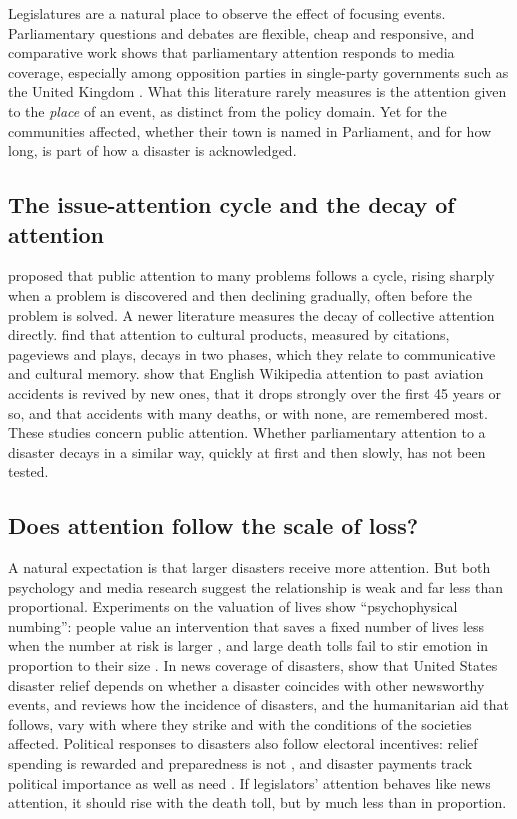 \documentclass[11pt,a4paper]{article}
\begin{document}
Legislatures are a natural place to observe the effect of focusing events. Parliamentary questions and debates are flexible, cheap and responsive, and comparative work shows that parliamentary attention responds to media coverage, especially among opposition parties in single-party governments such as the United Kingdom \citep{WalgraveVanAelst2006,Vliegenthart2016}. What this literature rarely measures is the attention given to the \emph{place} of an event, as distinct from the policy domain. Yet for the communities affected, whether their town is named in Parliament, and for how long, is part of how a disaster is acknowledged.

\subsection{The issue-attention cycle and the decay of attention}
\citet{Downs1972} proposed that public attention to many problems follows a cycle, rising sharply when a problem is discovered and then declining gradually, often before the problem is solved. A newer literature measures the decay of collective attention directly. \citet{Candia2019} find that attention to cultural products, measured by citations, pageviews and plays, decays in two phases, which they relate to communicative and cultural memory. \citet{GarciaGavilanes2017} show that English Wikipedia attention to past aviation accidents is revived by new ones, that it drops strongly over the first 45 years or so, and that accidents with many deaths, or with none, are remembered most. These studies concern public attention. Whether parliamentary attention to a disaster decays in a similar way, quickly at first and then slowly, has not been tested.

\subsection{Does attention follow the scale of loss?}
A natural expectation is that larger disasters receive more attention. But both psychology and media research suggest the relationship is weak and far less than proportional. Experiments on the valuation of lives show ``psychophysical numbing'': people value an intervention that saves a fixed number of lives less when the number at risk is larger \citep{Fetherstonhaugh1997}, and large death tolls fail to stir emotion in proportion to their size \citep{Slovic2007}. In news coverage of disasters, \citet{EisenseeStromberg2007} show that United States disaster relief depends on whether a disaster coincides with other newsworthy events, and \citet{Stromberg2007} reviews how the incidence of disasters, and the humanitarian aid that follows, vary with where they strike and with the conditions of the societies affected. Political responses to disasters also follow electoral incentives: relief spending is rewarded and preparedness is not \citep{HealyMalhotra2009}, and disaster payments track political importance as well as need \citep{GarrettSobel2003}. If legislators' attention behaves like news attention, it should rise with the death toll, but by much less than in proportion.
\end{document}
